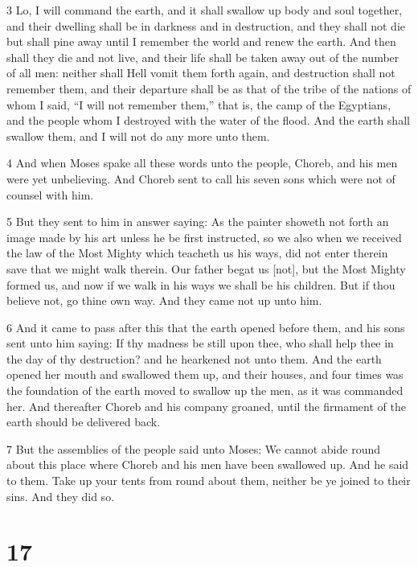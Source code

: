\par 3 Lo, I will command the earth, and it shall swallow up body and soul together, and their dwelling shall be in darkness and in destruction, and they shall not die but shall pine away until I remember the world and renew the earth. And then shall they die and not live, and their life shall be taken away out of the number of all men: neither shall Hell vomit them forth again, and destruction shall not remember them, and their departure shall be as that of the tribe of the nations of whom I said, “I will not remember them,” that is, the camp of the Egyptians, and the people whom I destroyed with the water of the flood. And the earth shall swallow them, and I will not do any more unto them. 

\par 4 And when Moses spake all these words unto the people, Choreb, and his men were yet unbelieving. And Choreb sent to call his seven sons which were not of counsel with him. 

\par 5 But they sent to him in answer saying: As the painter showeth not forth an image made by his art unless he be first instructed, so we also when we received the law of the Most Mighty which teacheth us his ways, did not enter therein save that we might walk therein. Our father begat us [not], but the Most Mighty formed us, and now if we walk in his ways we shall be his children. But if thou believe not, go thine own way. And they came not up unto him.

\par 6 And it came to pass after this that the earth opened before them, and his sons sent unto him saying: If thy madness be still upon thee, who shall help thee in the day of thy destruction? and he hearkened not unto them. And the earth opened her mouth and swallowed them up, and their houses, and four times was the foundation of the earth moved to swallow up the men, as it was commanded her. And thereafter Choreb and his company groaned, until the firmament of the earth should be delivered back. 

\par 7 But the assemblies of the people said unto Moses: We cannot abide round about this place where Choreb and his men have been swallowed up. And he said to them. Take up your tents from round about them, neither be ye joined to their sins. And they did so.

\chapter{17}

